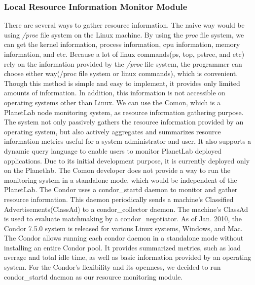 \documentclass{acm_proc_article-sp}
\begin{document}
\subsubsection{Local Resource Information Monitor Module}
There are several ways to gather resource information. The naive way would be using \textit{/proc} file system on the Linux machine. 
By using the \textit{proc} file system, we can get the kernel information, process information, cpu information, memory information, and etc. 
Because a lot of linux commands(ps, top, pstree, and etc) rely on the information provided by the \textit{/proc} file system,  
the programmer can choose either way(/proc file system or linux commands), which is convenient. 
Though this method is simple and easy to implement, it provides only limited amounts of information. In addition, this information is not accessible on operating systems other than Linux.
We can use the Comon\cite{comon}, which  is a PlanetLab\cite{planetlab} node monitoring system, as resource information gathering purpose. The system not only passively gathers the resource information
provided by an operating system, but also actively aggregates and summarizes resource information metrics useful for a system administrator and user. 
It also supports a dynamic query language to enable users to monitor PlanetLab deployed applications.
Due to its initial development purpose, it is currently deployed only on the Planetlab. The Comon developer does not provide a way to run the monitoring system in a standalone mode, which would be independent of the PlanetLab. 
The Condor\cite{condor} uses a condor\_startd daemon to monitor and gather resource information. 
This daemon periodically sends a machine's Classified Advertisements(ClassAd)\cite{classad} to a condor\_collector daemon. 
The machine's ClassAd is used to evaluate matchmaking by a condor\_negotiator. 
As of Jan. 2010, the Condor 7.5.0 system is released for various Linux systems, Windows, and Mac. The Condor allows running each condor daemon in a standalone mode without
installing an entire Condor pool. It provides summarized metrics, such as load average and total idle time, as well as basic information provided by an operating system.
For the Condor's flexibility and its openness, we decided to run condor\_startd daemon as our resource monitoring module.
\end{document}
